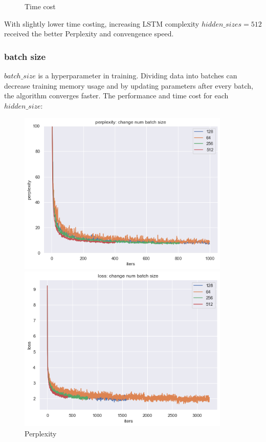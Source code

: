 \begin{figure}[H]
\begin{minipage}[b]{0.3\textwidth}
    \caption{Time cost}
    \label{Fig.2}
    \end{minipage}
\end{figure}
With slightly lower time costing, increasing LSTM complexity $hidden\_sizes = 512$ received the better Perplexity and convengence speed.

\subsubsection{batch size}
$batch\_size$ is a hyperparameter in training. Dividing data into batches can decrease training memory usage and by updating parameters after every batch, the algorithm converges faster. The performance and time cost for each $hidden\_size$:\\
\begin{figure}[H]
    \centering 
    \begin{minipage}[b]{0.3\textwidth} 
    \centering 
    \includegraphics[width=0.9\textwidth]{p_batch.png}
    \caption{Perplexity} 
    \label{Fig.1}
    \end{minipage}
    \begin{minipage}[b]{0.3\textwidth}
    \centering 
    \includegraphics[width=0.9\textwidth]{l_batch.png}

\end{minipage}
\end{figure}

